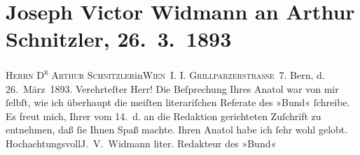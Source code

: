 

         \newcommand{\erwaehnteInstitutionen}{Institutionen: Der Bund}
         \newcommand{\erwaehnteOrte}{Orte: Bern, Grillparzerstraße, I., Innere Stadt, Wien}
         \newcommand{\erwaehnteWerke}{Werke: Anatol, Kunst und Litteratur}
               \section[Joseph Victor Widmann an Arthur Schnitzler, 26. 3. 1893]{ Joseph Victor Widmann an Arthur Schnitzler,
                    26. 3. 1893}\nopagebreak{}\rehead{ }\begin{ledgroupsized}[t]{13cm}\normalsize\beginnumbering \toendnotes[C]{\smallbreak\pagebreak[2]} 
\toendnotes[C]{\smallbreak}\pstart{}{\pb}\textsc{Herrn
                                D\textsuperscript{r} Arthur Schnitzler}\pend{}\pstart{}in\pend{}\pstart{}\textsc{Wien} I. \pend{}\pstart{}\textsc{I.
                                Grillparzerstraſse 7.}\pend{}{\bigskip}\pstart
           \raggedleft{}{\pb}Bern, d.
                            26. März 1893.\pend
           \pstart{}Verehrteſter Herr!\pend\pstart
           Die Beſprechung Ihres Anatol war von mir ſelbſt, wie ich überhaupt die meiſten
                    literariſchen Referate des »Bund« ſchreibe. Es
                    freut mich, Ihrer vom 14. d. an die Redaktion gerichteten Zuſchrift zu
                    entnehmen, daß ſie Ihnen Spaß machte.  Ihren
                        Anatol habe ich ſehr wohl gelobt.\pend
           \pstart Hochachtungsvoll\spacefill\mbox{J. V. Widmann}\pend{}\pstart
           \raggedleft{}liter. Redakteur des »Bund«\pend
           
         
         \endnumbering{}\end{ledgroupsized}  \newcommand{\dateiname}{L00193}\newcommand{\titel}{Joseph Victor Widmann an Arthur Schnitzler, 26. 3. 1893}\newcommand{\editorInnen}{Martin Anton Müller und Gerd-Hermann Susen}
      